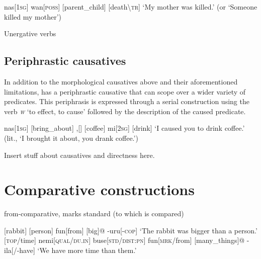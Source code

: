 \ex
\begingl
nas[\textsc{1sg}]
wan[\textsc{poss}]
[parent\_child]
[death\textbackslash\textsc{tr}]
\glft `My mother was killed.' (or `Someone killed my mother')
\endgl
\xe

Unergative verbs

\subsection{Periphrastic causatives}

In addition to the morphological causatives above and their aforementioned limitations, \lang{} has a periphrastic causative that can scope over a wider variety of predicates. This periphrasis is expressed through a serial construction using the verb \textit{\textsc{w}} `to effect, to cause' followed by the description of the caused predicate. 

\ex
\begingl
nas[\textsc{1sg}]
[bring\_about]
,[]
[coffee]
mi[\textsc{2sg}]
[drink]
\glft `I caused you to drink coffee.' (lit., `I brought it about, you drank coffee.')
\endgl
\xe

Insert stuff about causatives and directness here.

\section{Comparative constructions}

from-comparative, marks standard (to which is compared)

\pex
\a
\begingl
{}[rabbit]
[person]
fun[from]
[big]@
-uru[\textsc{-cop}]
\glft `The rabbit was bigger than a person.'
\endgl
\a
\begingl
{}[\textsc{top}/time]
nemi[\textsc{qual}/\textsc{du.in}]
buse[\textsc{std}/\textsc{dist:pn}]
fun[\textsc{mrk}/from]
[many\_things]@
-ila[/-have]
\glft `We have more time than them.'
\endgl
\xe